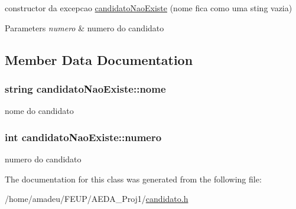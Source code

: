 constructor da excepcao \hyperlink{classcandidatoNaoExiste}{candidato\+Nao\+Existe} (nome fica como uma sting vazia) 


\begin{DoxyParams}{Parameters}
{\em numero} & numero do candidato \\
\hline
\end{DoxyParams}


\subsection{Member Data Documentation}
\subsubsection[{\texorpdfstring{nome}{nome}}]{\setlength{\rightskip}{0pt plus 5cm}string candidato\+Nao\+Existe\+::nome}\hypertarget{classcandidatoNaoExiste_ab70d4089271ae514955830e9248fa949}{}\label{classcandidatoNaoExiste_ab70d4089271ae514955830e9248fa949}


nome do candidato 

\subsubsection[{\texorpdfstring{numero}{numero}}]{\setlength{\rightskip}{0pt plus 5cm}int candidato\+Nao\+Existe\+::numero}\hypertarget{classcandidatoNaoExiste_ad5cd0ceebd377811c307f17070700a40}{}\label{classcandidatoNaoExiste_ad5cd0ceebd377811c307f17070700a40}


numero do candidato 



The documentation for this class was generated from the following file\+:\begin{DoxyCompactItemize}
\item 
/home/amadeu/\+F\+E\+U\+P/\+A\+E\+D\+A\+\_\+\+Proj1/\hyperlink{candidato_8h}{candidato.\+h}\end{DoxyCompactItemize}
